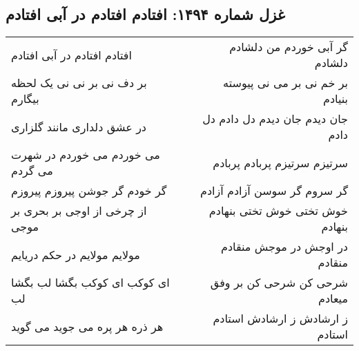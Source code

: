 \begin{center}
\section*{غزل شماره ۱۴۹۴: افتادم افتادم در آبی افتادم}
\label{sec:1494}
\begin{longtable}{l p{0.5cm} r}
افتادم افتادم در آبی افتادم
&&
گر آبی خوردم من دلشادم دلشادم
\\
بر دف نی بر نی نی یک لحظه بیگارم
&&
بر خم نی بر می نی پیوسته بنیادم
\\
در عشق دلداری مانند گلزاری
&&
جان دیدم جان دیدم دل دادم دل دادم
\\
می خوردم می خوردم در شهرت می گردم
&&
سرتیزم سرتیزم پربادم پربادم
\\
گر خودم گر جوشن پیروزم پیروزم
&&
گر سروم گر سوسن آزادم آزادم
\\
از چرخی از اوجی بر بحری بر موجی
&&
خوش تختی خوش تختی بنهادم بنهادم
\\
مولایم مولایم در حکم دریایم
&&
در اوجش در موجش منقادم منقادم
\\
ای کوکب ای کوکب بگشا لب بگشا لب
&&
شرحی کن شرحی کن بر وفق میعادم
\\
هر ذره هر پره می جوید می گوید
&&
ز ارشادش ز ارشادش استادم استادم
\\
\end{longtable}
\end{center}
